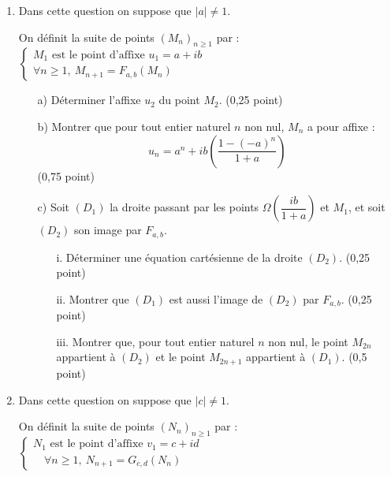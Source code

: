 \documentclass[11pt]{article}
\begin{document}
\begin{enumerate}
    \item Dans cette question on suppose que \( |a| \ne 1 \).
    
    On définit la suite de points \( (M_n)_{n \geq 1} \) par :
    \(
    \begin{cases}
    	M_1 \text{ est le point d'affixe } u_1 = a + ib\\
    	\forall n \geq 1,\ M_{n+1} = F_{a,b}(M_n)
    \end{cases}
    \)

    \begin{enumerate}
        \item[a)] Déterminer l'affixe \( u_2 \) du point \( M_2 \). \hfill (0,25 point)

        \item[b)] Montrer que pour tout entier naturel \( n \) non nul, \( M_n \) a pour affixe :
        \[
        u_n = a^n + ib \left( \frac{1 - (-a)^n}{1 + a} \right)
        \]
        \hfill (0,75 point)

        \item[c)] Soit \( (D_1) \) la droite passant par les points \( \Omega\left( \dfrac{ib}{1+a} \right) \) et \( M_1 \), et soit \( (D_2) \) son image par \( F_{a,b} \).
        \begin{enumerate}
            \item[i.] Déterminer une équation cartésienne de la droite \( (D_2) \). \hfill (0,25 point)

            \item[ii.] Montrer que \( (D_1) \) est aussi l'image de \( (D_2) \) par \( F_{a,b} \). \hfill (0,25 point)

            \item[iii.] Montrer que, pour tout entier naturel \( n \) non nul, le point \( M_{2n} \) appartient à \( (D_2) \) et le point \( M_{2n+1} \) appartient à \( (D_1) \). \hfill (0,5 point)
        \end{enumerate}
    \end{enumerate}

    \item Dans cette question on suppose que \( |c| \ne 1 \).
    
    On définit la suite de points \( (N_n)_{n \geq 1} \) par :
    \(
    \begin{cases}
    	N_1 \text{ est le point d'affixe } v_1 = c + id\\
    	\quad \forall n \geq 1,\ N_{n+1} = G_{c,d}(N_n)
    \end{cases}
    \)


\end{enumerate}
\end{document}
